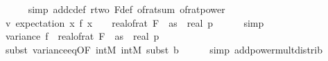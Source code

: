 \begin{isabellebody}
\ \ \ \ \isamarkupfalse%
\ {\isacharparenleft}{\kern0pt}simp\ add{\isacharcolon}{\kern0pt}c{\isacharunderscore}{\kern0pt}def\ r{\isacharunderscore}{\kern0pt}two\ F{\isacharunderscore}{\kern0pt}def\ of{\isacharunderscore}{\kern0pt}rat{\isacharunderscore}{\kern0pt}sum\ of{\isacharunderscore}{\kern0pt}rat{\isacharunderscore}{\kern0pt}power{\isacharparenright}{\kern0pt}\isanewline
\isanewline
\ \ \isamarkupfalse%
\ \isamarkupfalse%
\ v{\isacharunderscore}{\kern0pt}{}{\isacharcolon}{\kern0pt}\ {\isachardoublequoteopen}expectation\ {\isacharparenleft}{\kern0pt}{\isasymlambda}x{\isachardot}{\kern0pt}\ {\isacharparenleft}{\kern0pt}f\ x{\isacharparenright}{\kern0pt}\ {\isasymle}\ {}\ {\isacharasterisk}{\kern0pt}\ {\isacharparenleft}{\kern0pt}real{\isacharunderscore}{\kern0pt}of{\isacharunderscore}{\kern0pt}rat\ {\isacharparenleft}{\kern0pt}F\ {}\ as{\isacharparenright}{\kern0pt}{\isacharcircum}{\kern0pt}{}{\isacharparenright}{\kern0pt}\ {\isacharasterisk}{\kern0pt}\ {\isacharparenleft}{\kern0pt}{\isacharparenleft}{\kern0pt}real\ p{\isacharparenright}{\kern0pt}\isanewline
\ \ \ \ \isamarkupfalse%
\ simp\isanewline
\ \ \isanewline
\ \ \isamarkupfalse%
\ {\isachardoublequoteopen}variance\ f\ {\isasymle}\ {}{\isacharasterisk}{\kern0pt}{\isacharparenleft}{\kern0pt}real{\isacharunderscore}{\kern0pt}of{\isacharunderscore}{\kern0pt}rat\ {\isacharparenleft}{\kern0pt}F\ {}\ as{\isacharparenright}{\kern0pt}{\isacharcircum}{\kern0pt}{}{\isacharparenright}{\kern0pt}\ {\isacharasterisk}{\kern0pt}\ {\isacharparenleft}{\kern0pt}{\isacharparenleft}{\kern0pt}real\ p{\isacharparenright}{\kern0pt}\isanewline
\ \ \ \ \isamarkupfalse%
\ {\isacharparenleft}{\kern0pt}subst\ variance{\isacharunderscore}{\kern0pt}eq{\isacharbrackleft}{\kern0pt}OF\ int{\isacharunderscore}{\kern0pt}M\ int{\isacharunderscore}{\kern0pt}M{\isacharbrackright}{\kern0pt}{\isacharcomma}{\kern0pt}\ subst\ b{\isacharparenright}{\kern0pt}\isanewline
\ \ \ \ \isamarkupfalse%
\ {\isacharparenleft}{\kern0pt}simp\ add{\isacharcolon}{\kern0pt}power{\isacharunderscore}{\kern0pt}mult{\isacharunderscore}{\kern0pt}distrib{\isacharparenright}{\kern0pt}\isanewline

\end{isabellebody}
